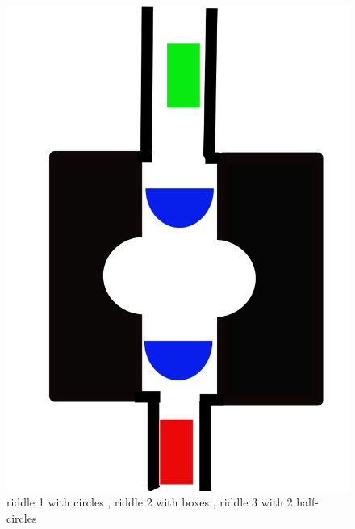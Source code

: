 \begin{figure}[h]
\includegraphics[scale=0.1]{mixedRiddle.png}
\caption{riddle 1 with circles , riddle 2 with boxes , riddle 3 with 2 half-circles}
\end{figure}

